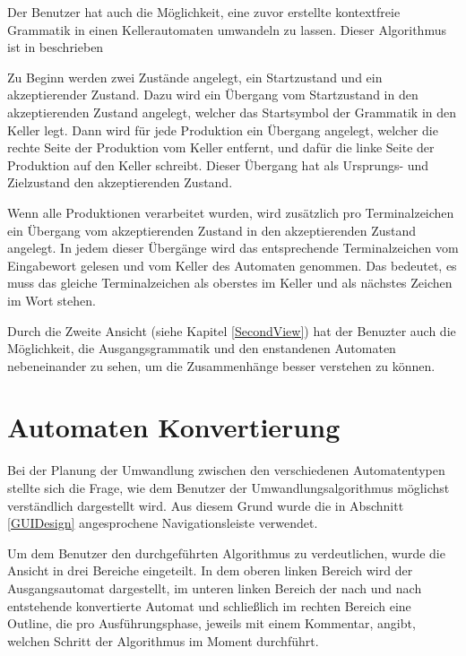 Der Benutzer hat auch die Möglichkeit, eine zuvor erstellte kontextfreie
Grammatik in einen Kellerautomaten umwandeln zu lassen. Dieser
Algorithmus ist in \cite{Compilers} beschrieben\vspace{10pt}

Zu Beginn werden zwei Zustände angelegt, ein Startzustand und ein
akzeptierender Zustand. Dazu wird ein Übergang vom Startzustand in den
akzeptierenden Zustand angelegt, welcher das Startsymbol der Grammatik in den
Keller legt. Dann wird für jede Produktion ein Übergang angelegt, welcher die rechte
Seite der Produktion vom Keller entfernt, und dafür die linke Seite der
Produktion auf den Keller schreibt. Dieser Übergang hat als
Ursprungs- und Zielzustand den akzeptierenden Zustand.\vspace{10pt}

Wenn alle Produktionen verarbeitet wurden, wird zusätzlich pro Terminalzeichen
ein Übergang vom akzeptierenden Zustand in den akzeptierenden Zustand angelegt.
In jedem dieser Übergänge wird das entsprechende Terminalzeichen vom Eingabewort
gelesen und vom Keller des Automaten genommen. Das bedeutet, es muss das gleiche
Terminalzeichen als oberstes im Keller  und als nächstes Zeichen im Wort
stehen.\vspace{10pt}

Durch die Zweite Ansicht (siehe Kapitel \ref{SecondView}) hat der Benuzter auch
die Möglichkeit, die Ausgangsgrammatik und den enstandenen Automaten
nebeneinander zu sehen, um die Zusammenhänge besser verstehen zu können.\vspace{10pt}


\section{Automaten Konvertierung}\label{ConverToMachine}

Bei der Planung der Umwandlung zwischen den verschiedenen Automatentypen stellte
sich die Frage, wie dem Benutzer der Umwandlungsalgorithmus möglichst
verständlich dargestellt wird. Aus diesem Grund wurde die in Abschnitt
\ref{GUIDesign} angesprochene Navigationsleiste verwendet.\vspace{10pt}

Um dem Benutzer den durchgeführten Algorithmus zu verdeutlichen, wurde die
Ansicht in drei Bereiche eingeteilt. In dem oberen linken Bereich wird der
Ausgangsautomat dargestellt, im unteren linken Bereich der nach und nach
entstehende konvertierte Automat und schließlich im rechten Bereich eine Outline,
die pro Ausführungsphase, jeweils mit einem Kommentar, angibt, welchen Schritt
der Algorithmus im Moment durchführt.\vspace{10pt}


